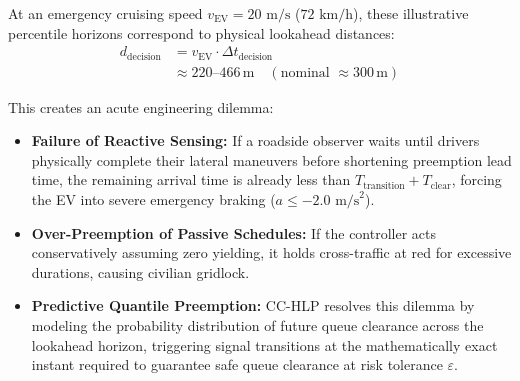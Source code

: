 \documentclass[journal,10pt,twocolumn]{IEEEtran}
\begin{document}
At an emergency cruising speed $v_{\text{EV}} = 20\text{ m/s}$ ($72\text{ km/h}$), these illustrative percentile horizons correspond to physical lookahead distances:
\begin{equation}
\begin{aligned}
d_{\text{decision}} &= v_{\text{EV}} \cdot \Delta t_{\text{decision}} \\[2pt]
&\approx 220\text{--}466\,\text{m} \quad (\text{nominal } \approx 300\,\text{m})
\end{aligned}
\end{equation}

This creates an acute engineering dilemma:
\begin{itemize}
    \item \textbf{Failure of Reactive Sensing:} If a roadside observer waits until drivers physically complete their lateral maneuvers before shortening preemption lead time, the remaining arrival time is already less than $T_{\text{transition}} + T_{\text{clear}}$, forcing the EV into severe emergency braking ($a \le -2.0\text{ m/s}^2$).
    \item \textbf{Over-Preemption of Passive Schedules:} If the controller acts conservatively assuming zero yielding, it holds cross-traffic at red for excessive durations, causing civilian gridlock.
    \item \textbf{Predictive Quantile Preemption:} CC-HLP resolves this dilemma by modeling the probability distribution of future queue clearance across the lookahead horizon, triggering signal transitions at the mathematically exact instant required to guarantee safe queue clearance at risk tolerance $\varepsilon$.
\end{itemize}
\end{document}
